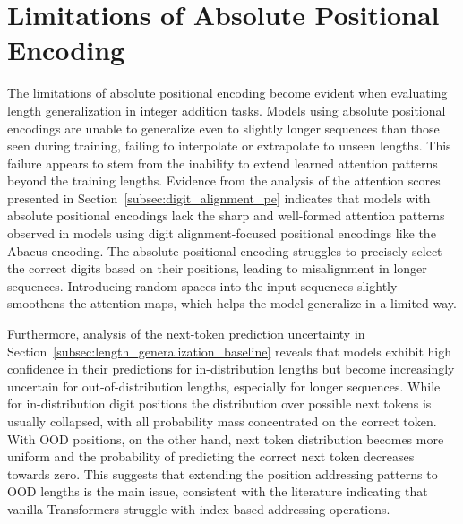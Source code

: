 \section{Limitations of Absolute Positional Encoding}\label{sec:absolute_positional_limitations}

The limitations of absolute positional encoding become evident when evaluating length generalization in integer addition tasks. Models using absolute positional encodings are unable to generalize even to slightly longer sequences than those seen during training, failing to interpolate or extrapolate to unseen lengths. This failure appears to stem from the inability to extend learned attention patterns beyond the training lengths. Evidence from the analysis of the attention scores presented in Section~\ref{subsec:digit_alignment_pe} indicates that models with absolute positional encodings lack the sharp and well-formed attention patterns observed in models using digit alignment-focused positional encodings like the Abacus encoding. The absolute positional encoding struggles to precisely select the correct digits based on their positions, leading to misalignment in longer sequences. Introducing random spaces into the input sequences slightly smoothens the attention maps, which helps the model generalize in a limited way.

Furthermore, analysis of the next-token prediction uncertainty in Section~\ref{subsec:length_generalization_baseline} reveals that models exhibit high confidence in their predictions for in-distribution lengths but become increasingly uncertain for out-of-distribution lengths, especially for longer sequences. While for in-distribution digit positions the distribution over possible next tokens is usually collapsed, with all probability mass concentrated on the correct token. With OOD positions, on the other hand, next token distribution becomes more uniform and the probability of predicting the correct next token decreases towards zero. This suggests that extending the position addressing patterns to OOD lengths is the main issue, consistent with the literature indicating that vanilla Transformers struggle with index-based addressing operations.

